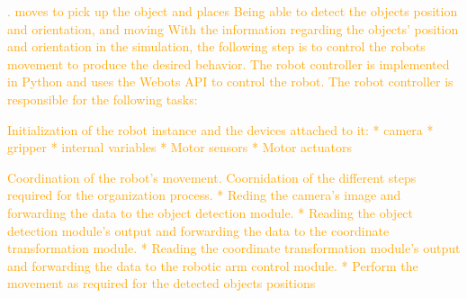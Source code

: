\textcolor{orange}{
. moves to pick up the object and places  
Being able to detect the objects position and orientation, and moving 
With the information regarding the objects' position and orientation in the simulation, the following step is to control the robots movement to produce the desired behavior. The robot controller is implemented in Python and uses the Webots API to control the robot. The robot controller is responsible for the following tasks:
}

\textcolor{orange}{
Initialization of the robot instance and the devices attached to it: 
* camera
* gripper
* internal variables
* Motor sensors
* Motor actuators
}

\textcolor{orange}{
Coordination of the robot's movement.
Coornidation of the different steps required for the organization process.
* Reding the camera's image and forwarding the data to the object detection module.
* Reading the object detection module's output and forwarding the data to the coordinate transformation module.
* Reading the coordinate transformation module's output and forwarding the data to the robotic arm control module.
* Perform the movement as required for the detected objects positions
} %

